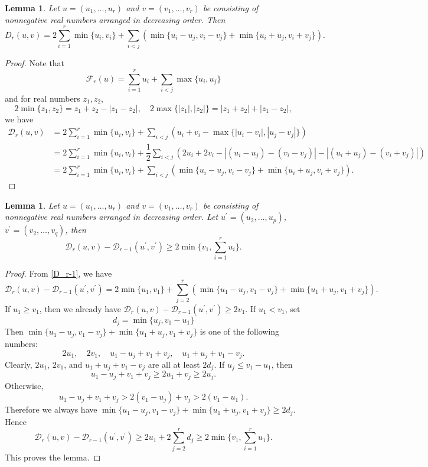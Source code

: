 \documentclass[11pt]{amsart}
\theoremstyle{plain}
\newtheorem{lemma}[thm]{Lemma}
\theoremstyle{definition}
\newcommand{\caD}{\mathcal{D}}
\newcommand{\caF}{\mathcal{F}}
\begin{document}
\begin{lemma}
Let $u=(u_1,\dots,u_r)$ and $v=(v_1,\dots,v_r)$ be consisting of nonnegative real numbers arranged in decreasing order. Then
	 \begin{equation}\label{D_r-1}
		D_r(u,v)=2\sum_{i=1}^r\min\{u_i,v_i\}+\sum_{i<j}(\min\{u_i-u_j,v_i-v_j\}+\min\{u_i+u_j,v_i+v_j\}).
	\end{equation}
\end{lemma}
\begin{proof}
	Note that
	\[\caF_r(u)=\sum_{i=1}^ru_i+\sum_{i<j}\max\{u_i,u_j\}\]
	 and for real numbers $z_1,z_2$,
	 \[2\min\{z_1,z_2\}=z_1+z_2-|z_1-z_2|,\quad 2\max\{|z_1|,|z_2|\}=|z_1+z_2|+|z_1-z_2|,\]
	  we have
	  \begin{align*}
	  	\caD_r(u,v)&=2\sum_{i=1}^r\min\{u_i,v_i\}+\sum_{i<j}(u_i+v_i-\max\{|u_i-v_i|,|u_j-v_j|\})\\
	  	&=2\sum_{i=1}^r\min\{u_i,v_i\}+\dfrac{1}{2}\sum_{i<j}(2u_i+2v_i-|(u_i-u_j)-(v_i-v_j)|-|(u_i+u_j)-(v_i+v_j)|)\\
	  	&=2\sum_{i=1}^r\min\{u_i,v_i\}+\sum_{i<j}(\min\{u_i-u_j,v_i-v_j\}+\min\{u_i+u_j,v_i+v_j\}).
	  \end{align*}
\end{proof}

\begin{lemma}
		Let $u=(u_1,\dots,u_r)$ and $v=(v_1,\dots,v_r)$ be consisting of nonnegative real numbers arranged in decreasing order. Let $u^\prime=(u_2,\dots,u_p)$,\ $v^\prime=(v_2,\dots,v_q)$, then
			\begin{equation}\label{D_r-2}
			\caD_r(u,v)-\caD_{r-1}(u^\prime,v^\prime)\ge 2\min\{v_1,\sum_{i=1}^ru
			_i\}.
		\end{equation}
\end{lemma}
\begin{proof}
	From \eqref{D_r-1}, we have
	\[\caD_r(u,v)-\caD_{r-1}(u^\prime,v^\prime)=2\min\{u_1,v_1\}+\sum_{j=2}^r(\min\{u_1-u_j,v_1-v_j\}+\min\{u_1+u_j,v_1+v_j\}).\]
	If $u_1\ge v_1$, then we already have $\caD_r(u,v)-\caD_{r-1}(u^\prime,v^\prime)\ge 2v_1$. If $u_1<v_1$, set
$$
d_j=\min\{u_j,v_1-u_1\}
$$
Then $\min\{u_1-u_j,v_1-v_j\}+\min\{u_1+u_j,v_1+v_j\}$ is one of the following numbers:
	 \[2u_1,\quad 2v_1,\quad u_1-u_j+v_1+v_j,\quad u_1+u_j+v_1-v_j.\]
	Clearly, $2u_1$, $2v_1$, and $u_1+u_j+v_1-v_j$ are all at least $2d_j$. If $u_j\le v_1-u_1$, then
$$
u_1-u_j+v_1+v_j\geq 2u_1+v_j  \geq 2u_j.
$$
 Otherwise,
	 \[u_1-u_j+v_1+v_j>2(v_1-u_j)+v_j>2(v_1-u_1).\]
	Therefore we always have $\min\{u_1-u_j,v_1-v_j\}+\min\{u_1+u_j,v_1+v_j\}\ge 2d_j$. Hence
	 \[\caD_r(u,v)-\caD_{r-1}(u^\prime,v^\prime)\ge 2u_1+2\sum_{j=2}^rd_j\ge 2\min\{v_1,\sum_{i=1}^ru_1\}.\]
	This proves the lemma.
\end{proof}
\end{document}
